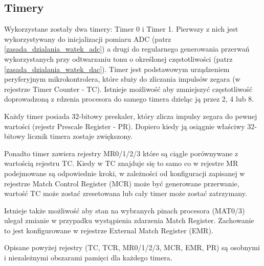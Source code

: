 \subsection{Timery}
Wykorzystane zostały dwa timery: Timer 0 i Timer 1. Pierwszy z nich jest wykorzystywany do inicjalizacji pomiaru ADC (patrz \ref{zasada_dzialania_watek_adc}) a drugi do regularnego generowania przerwań wykorzystanych przy odtwarzaniu tonu o określonej częstotliwości (patrz \ref{zasada_dzialania_watek_dac}). Timer jest podstawowym urządzeniem peryferyjnym mikrokontrolera, które służy do zliczania impulsów zegara (w rejestrze Timer Counter - TC). Istnieje możliwość aby zmniejszyć częstotliwość doprowadzoną z rdzenia procesora do samego timera dzieląc ją przez 2, 4 lub 8.

Każdy timer posiada 32-bitowy preskaler, który zlicza impulsy zegara do pewnej wartości (rejestr Prescale Register - PR). Dopiero kiedy ją osiągnie właściwy 32-bitowy licznik timera zostaje zwiększony.

Ponadto timer zawiera rejestry MR0/1/2/3 które są ciągle porównywane z wartością rejestru TC. Kiedy w TC znajduje się to samo co w rejestre MR podejmowane są odpowiednie kroki, w zależności od konfiguracji zapisanej w rejestrze Match Control Register (MCR) może być generowane przerwanie, wartość TC może zostać zresetowana lub cały timer może zostać zatrzymany.

Istnieje także możliwość aby stan na wybranych pinach procesora (MAT0/3) ulegał zmianie w przypadku wystąpienia zdarzenia Match Register. Zachowanie to jest konfigurowane w rejestrze External Match Register (EMR).

Opisane powyżej rejestry (TC, TCR, MR0/1/2/3, MCR, EMR, PR) są osobnymi i niezależnymi obszarami pamięci dla każdego timera.

